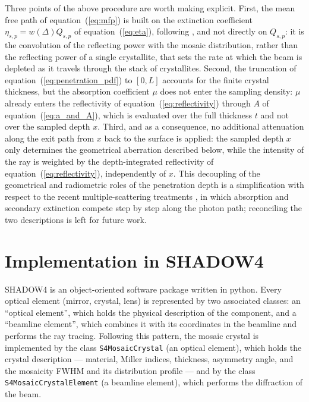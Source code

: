\documentclass{iucr}
\begin{document}
Three points of the above procedure are worth making explicit. First, the mean
free path of equation~(\ref{eq:mfp}) is built on the extinction coefficient
$\eta_{s,p} = w(\Delta) Q_{s,p}$ of equation~(\ref{eq:eta}), following
\cite{mosaicsSanchezDelRio1992}, and not directly on $Q_{s,p}$: it is the
convolution of the reflecting power with the mosaic distribution, rather than the
reflecting power of a single crystallite, that sets the rate at which the beam is
depleted as it travels through the stack of crystallites. Second, the truncation
of equation~(\ref{eq:penetration_pdf}) to $[0,L]$ accounts for the finite crystal
thickness, but the absorption coefficient $\mu$ does not enter the sampling
density: $\mu$ already enters the reflectivity of equation~(\ref{eq:reflectivity})
through $A$ of equation~(\ref{eq:a_and_A}), which is evaluated over the full
thickness $t$ and not over the sampled depth $x$. Third, and as a consequence,
no additional attenuation along the exit path from $x$ back to the surface is
applied: the sampled depth $x$ only determines the geometrical aberration
described below, while the intensity of the ray is weighted by the
depth-integrated reflectivity of equation~(\ref{eq:reflectivity}), independently
of $x$. This decoupling of the geometrical and radiometric roles of the
penetration depth is a simplification with respect to the recent
multiple-scattering treatments \cite{Wuttke2014, Bornemann2020, Alianelli2004,
Pablant2024, Gawne2026}, in which absorption and secondary extinction compete
step by step along the photon path; reconciling the two descriptions is left for
future work.


\section{Implementation in SHADOW4}
\label{sec:implementation}

SHADOW4 is an object-oriented software package written in python. Every optical
element (mirror, crystal, lens) is represented by two associated classes: an
``optical element'', which holds the physical description of the component, and a
``beamline element'', which combines it with its coordinates in the beamline and
performs the ray tracing. Following this pattern, the mosaic crystal is
implemented by the class \texttt{S4MosaicCrystal} (an optical element), which
holds the crystal description --- material, Miller indices, thickness, asymmetry
angle, and the mosaicity FWHM and its distribution profile --- and by the class
\texttt{S4MosaicCrystalElement} (a beamline element), which performs the
diffraction of the beam.
\end{document}
